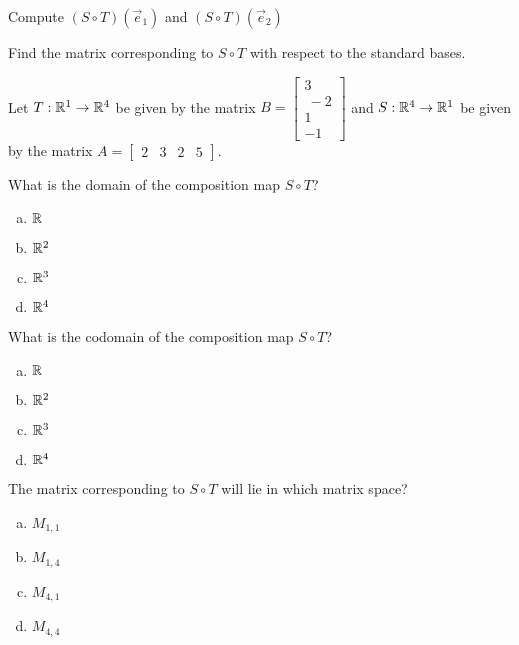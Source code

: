 \begin{applicationActivities}{1}{22}
\begin{activity}{0}
Compute $(S \circ T)(\vec{e}_1)$ and $(S \circ T)(\vec{e}_2)$
\end{activity}

\begin{activity}{0}
Find the matrix corresponding to $S \circ T$ with respect to the standard bases.
\end{activity}

\begin{activity}{0}
Let $T: \mathbb{R}^1 \rightarrow \mathbb{R}^4$ be given by the matrix $B=\begin{bmatrix} 3 \\\ -2 \\ 1 \\ -1\end{bmatrix}$ and $S: \mathbb{R}^4 \rightarrow \mathbb{R}^1$ be given by the matrix $A=\begin{bmatrix}2 & 3 & 2 & 5 \end{bmatrix}$.

What is the domain of the composition map $S \circ T$?
\begin{enumerate}[(a)]
\item $\mathbb{R}$
\item $\mathbb{R}^2$
\item $\mathbb{R}^3$
\item $\mathbb{R}^4$
\end{enumerate}
\end{activity}

\begin{activity}{0}
What is the codomain of the composition map $S \circ T$?
\begin{enumerate}[(a)]
\item $\mathbb{R}$
\item $\mathbb{R}^2$
\item $\mathbb{R}^3$
\item $\mathbb{R}^4$
\end{enumerate}
\end{activity}

\begin{activity}{0}
The matrix corresponding to $S \circ T$ will lie in which matrix space?
\begin{enumerate}[(a)]
\item $M_{1,1}$
\item $M_{1,4}$
\item $M_{4,1}$
\item $M_{4,4}$
\end{enumerate}
\end{activity}


\end{applicationActivities}
